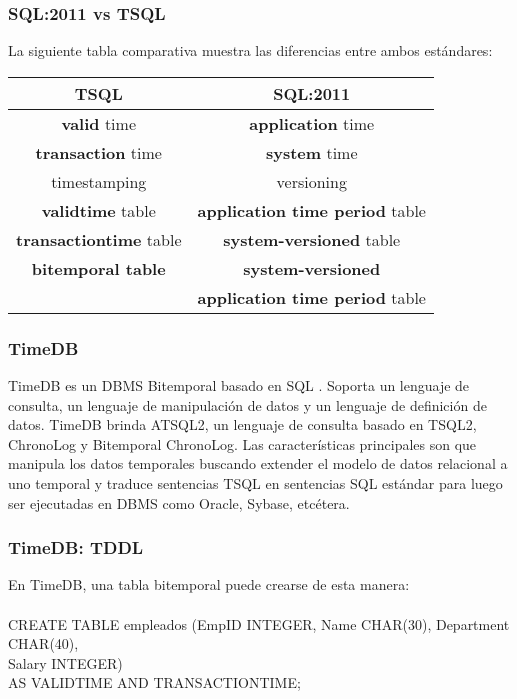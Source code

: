 \documentclass[a4paper,12pt,oneside]{report}
\begin{document}
\subsubsection*{SQL:2011 vs TSQL}
La siguiente tabla comparativa muestra las diferencias entre ambos est\'andares:
\begin{center}
\begin{tabular}{|c|c|}
\hline
TSQL & SQL:2011\\
\hline
\textbf{valid} time & \textbf{application} time\\
\textbf{transaction} time & \textbf{system} time\\
\hline
timestamping & versioning\\
\hline
\textbf{validtime} table & \textbf{application time period} table\\
\textbf{transactiontime} table & \textbf{system-versioned} table\\
\textbf{bitemporal table} & \textbf{system-versioned}\\
& \textbf{application time period} table\\
\hline
\end{tabular}
\end{center}

\subsubsection*{TimeDB}
TimeDB es un DBMS Bitemporal basado en SQL \cite{timedb}. Soporta un lenguaje de consulta, un lenguaje de manipulaci\'on de datos y un lenguaje de definici\'on de datos. TimeDB brinda ATSQL2, un lenguaje de consulta basado en TSQL2, ChronoLog \cite{chronolog} y Bitemporal ChronoLog. Las caracter\'isticas principales son que manipula los datos temporales buscando extender el modelo de datos relacional a uno temporal y traduce sentencias TSQL en sentencias SQL est\'andar para luego ser ejecutadas en DBMS como Oracle, Sybase, etc\'etera.

\subsubsection*{TimeDB: TDDL}
En TimeDB, una tabla bitemporal puede crearse de esta manera:\\
\ \\
CREATE TABLE empleados (EmpID INTEGER, Name CHAR(30), Department CHAR(40),\\
Salary INTEGER)\\
AS VALIDTIME AND TRANSACTIONTIME;
\end{document}
